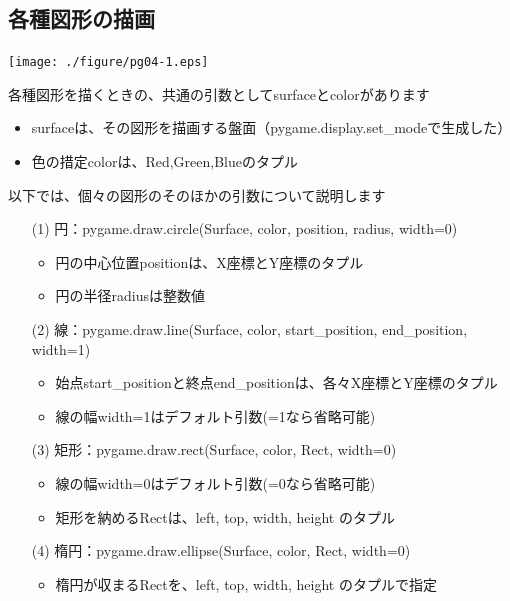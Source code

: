 \documentclass[uplatex,a4paper,11pt,oneside,openany]{jsbook}
\begin{document}
\subsection{各種図形の描画}

\begin{center}
\texttt{[image: ./figure/pg04-1.eps]}
\end{center}

各種図形を描くときの、共通の引数としてsurfaceとcolorがあります

\begin{itemize}
\item surfaceは、その図形を描画する盤面（pygame.display.set\_modeで生成した）
\item 色の措定colorは、Red,Green,Blueのタプル
\end{itemize}

以下では、個々の図形のそのほかの引数について説明します

\begin{enumerate}

  \item[(1)] 円：pygame.draw.circle(Surface, color, position, radius, width=0)

  \begin{itemize}
  \item 円の中心位置positionは、X座標とY座標のタプル
  \item 円の半径radiusは整数値
  \end{itemize}

  \item[(2)] 線：pygame.draw.line(Surface, color, start\_position, end\_position, width=1)

  \begin{itemize}
  \item 始点start\_positionと終点end\_positionは、各々X座標とY座標のタプル
  \item 線の幅width=1はデフォルト引数(=1なら省略可能)
  \end{itemize}

  \item[(3)] 矩形：pygame.draw.rect(Surface, color, Rect, width=0)

  \begin{itemize}
  \item 線の幅width=0はデフォルト引数(=0なら省略可能)
  \item 矩形を納めるRectは、left, top, width, height のタプル
  \end{itemize}

  \item[(4)] 楕円：pygame.draw.ellipse(Surface, color, Rect, width=0)

  \begin{itemize}
  \item 楕円が収まるRectを、left, top, width, height のタプルで指定
  \end{itemize}

\end{enumerate}
\end{document}
